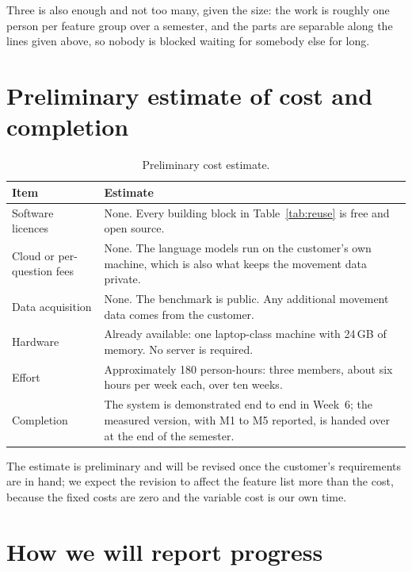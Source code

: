 \documentclass[12pt,a4paper]{report}
\begin{document}
Three is also enough and not too many, given the size: the work is roughly one
person per feature group over a semester, and the parts are separable along the
lines given above, so nobody is blocked waiting for somebody else for long.

\section{Preliminary estimate of cost and completion}

\begin{table}[H]
  \centering
  \caption{Preliminary cost estimate.}
  \label{tab:cost}
  \begin{tabular}{@{}p{5.4cm}p{9.4cm}@{}}
    \toprule[1.5pt]
    \textbf{Item} & \textbf{Estimate} \\
    \midrule
    Software licences & None. Every building block in
      Table~\ref{tab:reuse} is free and open source. \\
    \addlinespace
    Cloud or per-question fees & None. The language models run on the
      customer's own machine, which is also what keeps the movement data
      private. \\
    \addlinespace
    Data acquisition & None. The benchmark is public. Any additional movement
      data comes from the customer. \\
    \addlinespace
    Hardware & Already available: one laptop-class machine with 24\,GB of
      memory. No server is required. \\
    \addlinespace
    Effort & Approximately 180 person-hours: three members, about six hours
      per week each, over ten weeks. \\
    \addlinespace
    Completion & The system is demonstrated end to end in Week~6; the measured
      version, with M1 to M5 reported, is handed over at the end of the
      semester. \\
    \bottomrule[1.5pt]
  \end{tabular}
\end{table}

The estimate is preliminary and will be revised once the customer's
requirements are in hand; we expect the revision to affect the feature list more
than the cost, because the fixed costs are zero and the variable cost is our own
time.

\section{How we will report progress}
\end{document}
